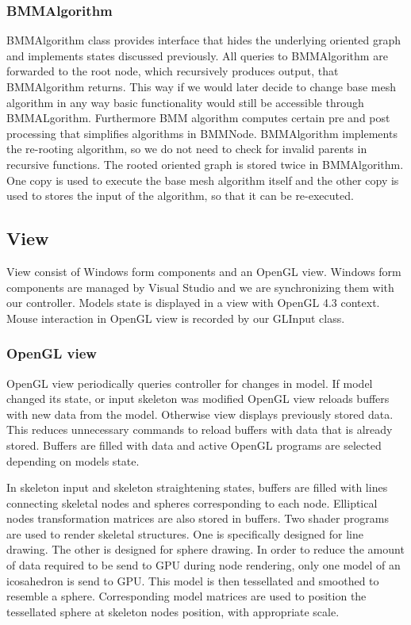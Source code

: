 \subsubsection{BMMAlgorithm}

BMMAlgorithm class provides interface that hides the underlying oriented graph and implements states discussed previously.
All queries to BMMAlgorithm are forwarded to the root node, which recursively produces output, that BMMAlgorithm returns.
This way if we would later decide to change base mesh algorithm in any way basic functionality would still be accessible through BMMALgorithm.
Furthermore BMM algorithm computes certain pre and post processing that simplifies algorithms in BMMNode.
BMMAlgorithm implements the re-rooting algorithm, so we do not need to check for invalid parents in recursive functions.
The rooted oriented graph is stored twice in BMMAlgorithm.
One copy is used to execute the base mesh algorithm itself and the other copy is used to stores the input of the algorithm, so that it can be re-executed.

\subsection{View}

View consist of Windows form components and an OpenGL view.
Windows form components are managed by Visual Studio and we are synchronizing them with our controller.
Models state is displayed in a view with OpenGL 4.3 context.
Mouse interaction in OpenGL view is recorded by our GLInput class.

\subsubsection{OpenGL view}

OpenGL view periodically queries controller for changes in model.
If model changed its state, or input skeleton was modified OpenGL view reloads buffers with new data from the model.
Otherwise view displays previously stored data.
This reduces unnecessary commands to reload buffers with data that is already stored.
Buffers are filled with data and active OpenGL programs are selected depending on models state.

In skeleton input and skeleton straightening states, buffers are filled with lines connecting skeletal nodes and spheres corresponding to each node.
Elliptical nodes transformation matrices are also stored in buffers.
Two shader programs are used to render skeletal structures.
One is specifically designed for line drawing.
The other is designed for sphere drawing.
In order to reduce the amount of data required to be send to GPU during node rendering, only one model of an icosahedron is send to GPU.
This model is then tessellated and smoothed to resemble a sphere.
Corresponding model matrices are used to position the tessellated sphere at skeleton nodes position, with appropriate scale.

